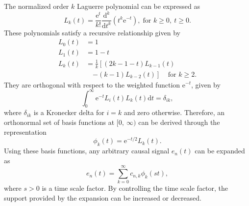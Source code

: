 \documentclass[conference, a4paper]{IEEEtran}
\begin{document}
The normalized order $k$ Laguerre polynomial can be expressed as
\begin{equation}
L_k(t)=\frac{\mathrm{e}^t}{k!}\frac{\mathrm{d}^k}{\mathrm{d}t^k}(t^k\mathrm{e}^{-t}),\;
\text{for $k\ge 0,\:t\ge 0$}.
\end{equation}
These polynomials satisfy a recursive relationship given by
\begin{equation}
\begin{split}
L_0(t)&=1 \\
L_1(t)&=1-t \\
L_k(t)&=\frac{1}{k}\left [ (2k-1-t)L_{k-1}(t)\right . \\
 &\quad \left . -(k-1)L_{k-2}(t)\right ]
\;\;\;\;\text{for $k\ge 2$.}
\end{split}
\end{equation}
They are orthogonal with respect to the weighted function
$\mathrm{e}^{-t}$, given by
\begin{equation}
\int _{0}^{\infty}\mathrm{e}^{-t}L_i(t)L_k(t)\mathrm{d}t=\delta _{ik},
\end{equation}
where $\delta _{ik}$ is a Kronecker delta for $i=k$ and zero otherwise.
Therefore, an orthonormal set of basis functions at $[0,\:\infty)$ can be derived through
the representation
\begin{equation}
\phi _k(t)=\mathrm{e}^{-t/2}L_k(t).
\end{equation}
Using these basis functions, any arbitrary causal signal $e_n(t)$ can be
expanded as
\begin{equation}
e_n(t)=\sum _{k=0}^{\infty}c_{n,k}\phi _k(st),
\end{equation}
where $s>0$ is a time scale factor. By controlling the time scale
factor, the support provided by the expansion can be increased or
decreased.
\end{document}
